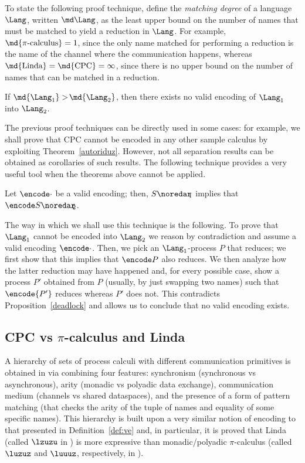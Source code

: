 \documentclass{LMCS}
\begin{document}
To state the following proof technique, define the {\em matching degree} 
of a language $\Lang$, written $\md\Lang$, as the least upper bound on the number 
of names that must be matched to yield a reduction in $\Lang$. For example,
$\md{\pi\mbox{-calculus}} = 1$, since the only name matched for performing
a reduction is the name of the channel where the communication happens,
whereas $\md{\mbox{Linda}} = \md{\mbox{CPC}} = \infty$, since there is no upper bound
on the number of names that can be matched in a reduction.

\begin{thm}
\label{match}
If $\md{\Lang_1} > \! \md{\Lang_2}$, then there exists no 
valid encoding of $\Lang_1$ into $\Lang_2$.
\end{thm}

The previous proof techniques can be directly used in some cases: for example,
we shall prove that CPC cannot be encoded in any other sample calculus by exploiting
Theorem~\ref{autoriduz}. However, not all separation results can be obtained as 
corollaries of such results. The following technique provides a very useful tool when
the theorems above cannot be applied.

\begin{prop}
\label{deadlock}
Let $\encode\cdot$ be a valid encoding; then, $S \noredar\!\!_1$
implies that $\encode S \noredar\!\!_2$.
\end{prop}

The way in which we shall use this technique is the following. To prove that 
$\Lang_1$ cannot be encoded into $\Lang_2$ we reason by contradiction and assume a
valid encoding $\encode\cdot$. Then, we pick an $\Lang_1$-process $P$ that reduces;
we first show that this implies that $\encode P$ also reduces. We then analyze how
the latter reduction may have happened and, for every possible case, show a process
$P'$ obtained from $P$ (usually, by just swapping two names) such that $\encode{P'}$
reduces whereas $P'$ does not. This contradicts Proposition~\ref{deadlock}
and allows us to conclude that no valid encoding exists.


\subsection{CPC vs $\pi$-calculus and Linda}
\label{subsec:pi-linda}

A hierarchy of sets of process calculi with different communication primitives is
obtained in \cite{G:IC08} via combining four features: 
synchronism (synchronous vs asynchronous), 
arity (monadic vs polyadic data exchange), 
communication medium (channels vs shared dataspaces), 
and the presence of a form of pattern matching (that checks the arity of the 
tuple of names and equality of some specific names).
This hierarchy is built upon a very similar notion of encoding to that presented
in Definition~\ref{def:ve} and, in particular, it is proved that Linda \cite{Gel85} (called $\lzuzu$ in \cite{G:IC08}) is more expressive than
monadic/polyadic $\pi$-calculus \cite{milner.parrow.ea:calculus-mobile,milner:polyadic-tutorial} (called $\luzuz$ and $\luuuz$, respectively, in \cite{G:IC08}).
\end{document}
